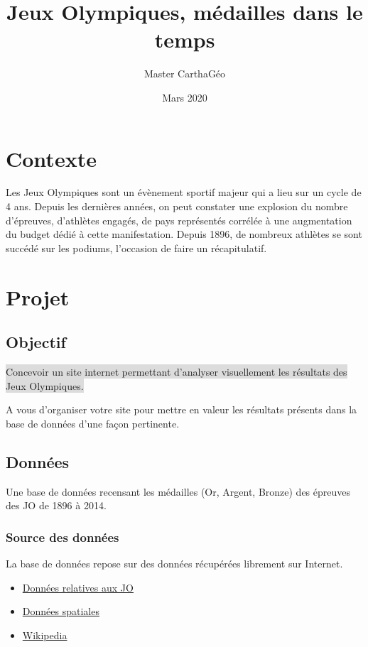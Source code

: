 \documentclass{article}
\title{Jeux Olympiques, médailles dans le temps}
\author{Master CarthaGéo}
\date{Mars 2020}
\begin{document}
\maketitle

\section{Contexte}

Les Jeux Olympiques sont un évènement sportif majeur qui a lieu sur un cycle de 4 ans. Depuis les dernières années, on peut constater une explosion du nombre d’épreuves, d’athlètes engagés, de pays représentés corrélée à une augmentation du budget dédié à cette manifestation.
Depuis 1896, de nombreux athlètes se sont succédé sur les podiums, l'occasion de faire un récapitulatif.

\section{Projet}

\subsection{Objectif}

\vspace{3mm}

\colorbox{Gainsboro}{
Concevoir un site internet permettant d’analyser visuellement les résultats des Jeux Olympiques.
}

\vspace{5mm}

A vous d'organiser votre site pour mettre en valeur les résultats présents dans la base de données d'une façon pertinente.

\subsection{Données}

Une base de données recensant les médailles (Or, Argent, Bronze) des épreuves des JO de 1896 à 2014.

\subsubsection{Source des données}

La base de données repose sur des données récupérées librement sur Internet.

\begin{itemize}

\item
\href{https://www.kaggle.com/the-guardian/olympic-games/home}{Données relatives aux JO}

\item
\href{http://www.naturalearthdata.com/downloads/10m-cultural-vectors/10m-admin-0-details/}{Données spatiales}

\item
\href{http://www.wikipedia.org}{Wikipedia}

\end{itemize}
\end{document}
